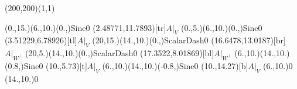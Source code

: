 \unitlength=1bp%

\begin{feynartspicture}(200,200)(1,1)

\FADiagram{}
\FAProp(0.,15.)(6.,10.)(0.,){Sine}{0}
\FALabel(2.48771,11.7893)[tr]{$A|_V$}
\FAProp(0.,5.)(6.,10.)(0.,){Sine}{0}
\FALabel(3.51229,6.78926)[tl]{$A|_V$}
\FAProp(20,15.)(14.,10.)(0.,){ScalarDash}{0}
\FALabel(16.6478,13.0187)[br]{$A|_{W^\perp}$}
\FAProp(20,5.)(14.,10.)(0.,){ScalarDash}{0}
\FALabel(17.3522,8.01869)[bl]{$A|_{W^\perp}$}
\FAProp(6.,10.)(14.,10.)(0.8,){Sine}{0}
\FALabel(10.,5.73)[t]{$A|_V$}
\FAProp(6.,10.)(14.,10.)(-0.8,){Sine}{0}
\FALabel(10.,14.27)[b]{$A|_V$}
\FAVert(6.,10.){0}
\FAVert(14.,10.){0}
\end{feynartspicture}

